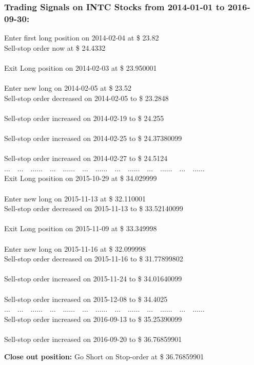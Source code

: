 \documentclass[slidestop,compress,mathserif,9pt]{beamer}
\def\b{\begin{center}}
\def\e{\end{center}}
\begin{document}
\begin{frame}[allowframebreaks]

\frametitle{Trading Signals on INTC Stocks from 2014-01-01 to 2016-09-30:}
\small{
Enter first long position on 2014-02-04 at \$ 23.82\\
Sell-stop order now at \$ 24.4332\\
\hrulefill \\
Exit Long position on 2014-02-03 at \$ 23.950001\\
\hrulefill \\
Enter new long on 2014-02-05 at \$ 23.52\\
Sell-stop order decreased on 2014-02-05 to \$ 23.2848\\
\hrulefill\\
Sell-stop order increased on 2014-02-19 to \$ 24.255\\
\hrulefill\\
Sell-stop order increased on 2014-02-25 to \$ 24.37380099\\
\hrulefill\\
Sell-stop order increased on 2014-02-27 to \$ 24.5124\\
$\ldots  \quad \ldots \quad  \ldots \ldots  \quad \ldots \quad  \ldots \ldots  \quad \ldots \quad  \ldots \ldots  \quad \ldots \quad  \ldots  \ldots  \quad \ldots \quad  \ldots \ldots  \quad \ldots \quad  \ldots \ldots  $ \\
Exit Long position on 2015-10-29 at \$ 34.029999\\
\hrulefill\\
Enter new long on 2015-11-13 at \$ 32.110001\\
Sell-stop order decreased on 2015-11-13 to \$ 33.52140099\\
\hrulefill\\
Exit Long position on 2015-11-09 at \$ 33.349998\\
\hrulefill\\
Enter new long on 2015-11-16 at \$ 32.099998\\
Sell-stop order decreased on 2015-11-16 to \$ 31.77899802\\
\hrulefill\\

Sell-stop order increased on 2015-11-24 to \$ 34.01640099\\
\hrulefill\\
Sell-stop order increased on 2015-12-08 to \$ 34.4025\\
$\ldots  \quad \ldots \quad  \ldots \ldots  \quad \ldots \quad  \ldots \ldots  \quad \ldots \quad  \ldots \ldots  \quad \ldots \quad  \ldots  \ldots  \quad \ldots \quad  \ldots \ldots  \quad \ldots \quad  \ldots \ldots  $ \\
Sell-stop order increased on 2016-09-13 to \$ 35.25390099\\
\hrulefill\\
Sell-stop order increased on 2016-09-20 to \$ 36.76859901\\
\b
\textbf{Close out position:} Go Short on Stop-order at \$ 36.76859901  
\e
}




\end{frame}
\end{document}
